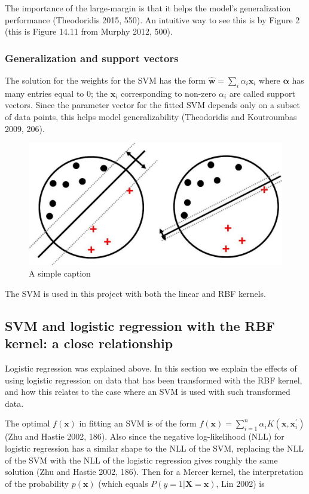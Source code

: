 \documentclass[letterpaper, 11pt]{article}
\newcommand{\vect}[1]{\boldsymbol{#1}}
\begin{document}
The importance of the large-margin is that it helps the model's generalization performance (Theodoridis 2015, 550). An intuitive way to see this is by Figure 2 (this is Figure 14.11 from Murphy 2012, 500).

\subsubsection{Generalization and support vectors}

The solution for the weights for the SVM has the form $\widehat{\vect{w}} = \sum_i \alpha_i \vect{x}_i$ where $\vect{\alpha}$ has many entries equal to 0; the $\vect{x}_i$ corresponding to non-zero $\alpha_i$ are called support vectors. Since the parameter vector for the fitted SVM depends only on a subset of data points, this helps model generalizability (Theodoridis and Koutroumbas 2009, 206).

\begin{figure}[ht!]
\centering
\includegraphics[width=120mm]{largeMarginPrinciple2.jpg}
\caption{A simple caption \label{overflow}}
\end{figure}

The SVM is used in this project with both the linear and RBF kernels.

\subsection{SVM and logistic regression with the RBF kernel: a close relationship}

Logistic regression was explained above. In this section we explain the effects of using logistic regression on data that has been transformed with the RBF kernel, and how this relates to the case where an SVM is used with such transformed data.

The optimal $f(\vect{x})$ in fitting an SVM is of the form $f(\vect{x}) = \sum_{i=1}^{n} \alpha_i K(\vect{x}, \vect{x}_i^\prime)$ (Zhu and Hastie 2002, 186). Also since the negative log-likelihood (NLL) for logistic regression has a similar shape to the NLL of the SVM, replacing the NLL of the SVM with the NLL of the logistic regression gives roughly the same solution (Zhu and Hastie 2002, 186). Then for a Mercer kernel, the interpretation of the probability $p(\vect{x})$ (which equals $P(y = 1 | \vect{X} = \vect{x})$, Lin 2002) is
\end{document}
